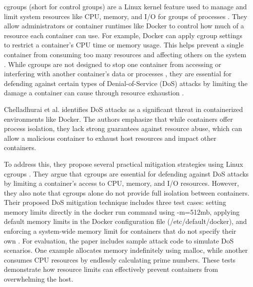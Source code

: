 \begin{doublespace}
cgroups (short for control groups) are a Linux kernel feature used to manage and limit system resources like CPU, memory, and I/O for groups of processes \cite{chelladhurai2016securing}. They allow administrators or container runtimes like Docker to control how much of a resource each container can use. For example, Docker can apply cgroup settings to restrict a container’s CPU time or memory usage. This helps prevent a single container from consuming too many resources and affecting others on the system \cite{chelladhurai2016securing}. While cgroups are not designed to stop one container from accessing or interfering with another container’s data or processes \cite{chelladhurai2016securing}, they are essential for defending against certain types of Denial-of-Service (DoS) attacks by limiting the damage a container can cause through resource exhaustion \cite{chelladhurai2016securing}.

Chelladhurai et al. \cite{chelladhurai2016securing} identifies DoS attacks as a significant threat in containerized environments like Docker. The authors emphasize that while containers offer process isolation, they lack strong guarantees against resource abuse, which can allow a malicious container to exhaust host resources and impact other containers.

To address this, they propose several practical mitigation strategies using Linux cgroups \cite{chelladhurai2016securing}. They argue that cgroups are essential for defending against DoS attacks by limiting a container’s access to CPU, memory, and I/O resources. However, they also note that cgroups alone do not provide full isolation between containers. Their proposed DoS mitigation technique includes three test cases: setting memory limits directly in the docker run command using -m=512mb, applying default memory limits in the Docker configuration file (/etc/default/docker), and enforcing a system-wide memory limit for containers that do not specify their own \cite{chelladhurai2016securing}. For evaluation, the paper includes sample attack code to simulate DoS scenarios. One example allocates memory indefinitely using malloc, while another consumes CPU resources by endlessly calculating prime numbers. These tests demonstrate how resource limits can effectively prevent containers from overwhelming the host.


\end{doublespace}
